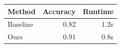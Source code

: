 \documentclass{article}
\begin{document}
\begin{tabular}{lrr}
  \toprule
  Method & Accuracy & Runtime \\
  \midrule
  Baseline & 0.82 & 1.2s \\
  Ours     & 0.91 & 0.8s \\
  \bottomrule
\end{tabular}
\end{document}
